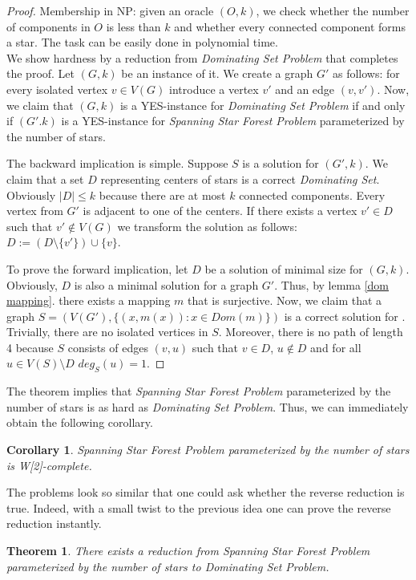 \documentclass[en]{pracamgr}
\newtheorem{theorem}{Theorem}
\newtheorem{corollary}{Corollary}
\newcommand{\ssfp}{\sc{Spanning Star Forest}}
\newcommand{\domset}{\emph{Dominating Set}}
\newcommand{\domsetp}{\emph{Dominating Set Problem}}
\newcommand{\kssf}{\emph{Spanning Star Forest Problem} parameterized by the number of stars}
\begin{document}
\begin{proof}
	Membership in NP: given an oracle $(O,k)$, we check whether the number of	components in $O$ is less than $k$ and whether every connected component	forms a star. The task can be easily done in polynomial time.\\
	
	We show hardness by a reduction from \domsetp{} that completes the proof. Let $(G,k)$ be an instance of it. We create a graph	$G'$ as follows: for every isolated vertex $v \in V(G)$ introduce a vertex $v'$ and an edge $(v,v')$. Now, we claim that $(G,k)$ is a YES-instance for \domsetp{} if and only if $(G'.k)$ is a YES-instance for \kssf{}. 
	
	The backward implication is simple. Suppose $S$ is a solution for $(G',k)$. We claim that a set $D$ representing centers of stars is a correct \domset{}. Obviously $|D| \leq k$ because there are at most $k$ connected components. Every vertex from $G'$ is adjacent to one of the centers. If there exists a vertex $v' \in D$ such that $v' \notin V(G)$ we transform the solution as follows: $D := (D \setminus \{v'\})\cup \{v\}$. 
	
	To prove the forward implication, let $D$ be a solution of minimal size for $(G,k)$. Obviously, $D$ is also a minimal solution for a graph $G'$. Thus, by lemma \ref{dom mapping}. there exists a mapping $m$ that is surjective. Now, we claim that a graph $S=(V(G'),\{(x,m(x)): x \in Dom(m)\})$ is a correct solution for \ssfp{}. Trivially, there are no isolated vertices in $S$. Moreover, there is no path of length 4 because $S$ consists of edges $(v,u)$ such that $v \in D$, $u \notin D$ and for all $u \in V(S) \setminus D$ $deg_S(u)=1$.
	
\end{proof}

The theorem implies that \kssf{} is as hard as \domsetp{}. Thus, we can immediately obtain the following corollary.

\begin{corollary}
	\kssf{} is {\normalfont W[2]-complete}.
\end{corollary}

The problems look so similar that one could ask whether the reverse reduction is true. Indeed, with a small twist to the previous idea one can prove the reverse reduction instantly.  

\begin{theorem}\label{ssf dom}
	There exists a reduction from \kssf{} to \domsetp{}.
\end{theorem}
\end{document}
